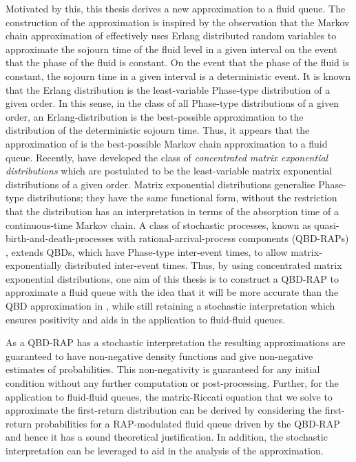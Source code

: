 Motivated by this, this thesis derives a new approximation to a fluid queue. The construction of the approximation is inspired by the observation that the Markov chain approximation of \cite{bo2013} effectively uses Erlang distributed random variables to approximate the sojourn time of the fluid level in a given interval on the event that the phase of the fluid is constant. On the event that the phase of the fluid is constant, the sojourn time in a given interval is a deterministic event. It is known that the Erlang distribution is the least-variable Phase-type distribution of a given order. In this sense, in the class of all Phase-type distributions of a given order, an Erlang-distribution is the best-possible approximation to the distribution of the deterministic sojourn time. Thus, it appears that the approximation of \cite{bo2013} is the best-possible Markov chain approximation to a fluid queue. Recently, \cite{hhat2020} have developed the class of \emph{concentrated matrix exponential distributions} which are postulated to be the least-variable matrix exponential distributions of a given order. Matrix exponential distributions generalise Phase-type distributions; they have the same functional form, without the restriction that the distribution has an interpretation in terms of the absorption time of a continuous-time Markov chain. A class of stochastic processes, known as quasi-birth-and-death-processes with rational-arrival-process components (QBD-RAPs) \citep{bn2010}, extends QBDs, which have Phase-type inter-event times, to allow matrix-exponentially distributed inter-event times. Thus, by using concentrated matrix exponential distributions, one aim of this thesis is to construct a QBD-RAP to approximate a fluid queue with the idea that it will be more accurate than the QBD approximation in \cite{bo2013}, while still retaining a stochastic interpretation which ensures positivity and aids in the application to fluid-fluid queues. 

As a QBD-RAP has a stochastic interpretation the resulting approximations are guaranteed to have non-negative density functions and give non-negative estimates of probabilities. This non-negativity is guaranteed for any initial condition without any further computation or post-processing. Further, for the application to fluid-fluid queues, the matrix-Riccati equation that we solve to approximate the first-return distribution can be derived by considering the first-return probabilities for a RAP-modulated fluid queue driven by the QBD-RAP \citep{p2019,bgnp2021} and hence it has a sound theoretical justification. In addition, the stochastic interpretation can be leveraged to aid in the analysis of the approximation. %

